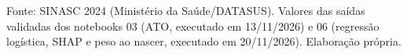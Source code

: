 \documentclass[10pt,a4paper]{article}
\begin{document}
\par\vspace{6pt}{\color{iptgrade}\rule{\linewidth}{0.5pt}}\par{\scriptsize\color{iptcinza} Fonte: SINASC 2024 (Ministério da Saúde/DATASUS). Valores das saídas validadas dos notebooks 03 (ATO, executado em 13/11/2026) e 06 (regressão logística, SHAP e peso ao nascer, executado em 20/11/2026). Elaboração própria.\par}
\end{document}
